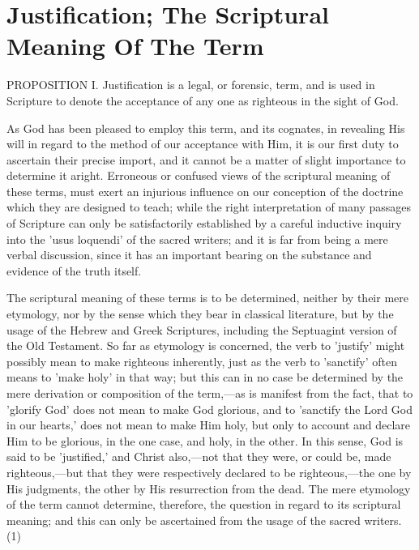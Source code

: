 \documentclass[
]{book}
\begin{document}
\hypertarget{justification-the-scriptural-meaning-of-the-term}{%
\chapter{Justification; The Scriptural Meaning Of The Term}\label{justification-the-scriptural-meaning-of-the-term}}

PROPOSITION I. Justification is a legal, or forensic, term, and is used in Scripture to denote the acceptance of any one as righteous in the sight of God.

As God has been pleased to employ this term, and its cognates, in revealing His will in regard to the method of our acceptance with Him, it is our first duty to ascertain their precise import, and it cannot be a matter of slight importance to determine it aright. Erroneous or confused views of the scriptural meaning of these terms, must exert an injurious influence on our conception of the doctrine which they are designed to teach; while the right interpretation of many passages of Scripture can only be satisfactorily established by a careful inductive inquiry into the 'usus loquendi' of the sacred writers; and it is far from being a mere verbal discussion, since it has an important bearing on the substance and evidence of the truth itself.

The scriptural meaning of these terms is to be determined, neither by their mere etymology, nor by the sense which they bear in classical literature, but by the usage of the Hebrew and Greek Scriptures, including the Septuagint version of the Old Testament. So far as etymology is concerned, the verb to 'justify' might possibly mean to make righteous inherently, just as the verb to 'sanctify' often means to 'make holy' in that way; but this can in no case be determined by the mere derivation or composition of the term,---as is manifest from the fact, that to 'glorify God' does not mean to make God glorious, and to 'sanctify the Lord God in our hearts,' does not mean to make Him holy, but only to account and declare Him to be glorious, in the one case, and holy, in the other. In this sense, God is said to be 'justified,' and Christ also,---not that they were, or could be, made righteous,---but that they were respectively declared to be righteous,---the one by His judgments, the other by His resurrection from the dead. The mere etymology of the term cannot determine, therefore, the question in regard to its scriptural meaning; and this can only be ascertained from the usage of the sacred writers. (1)
\end{document}
